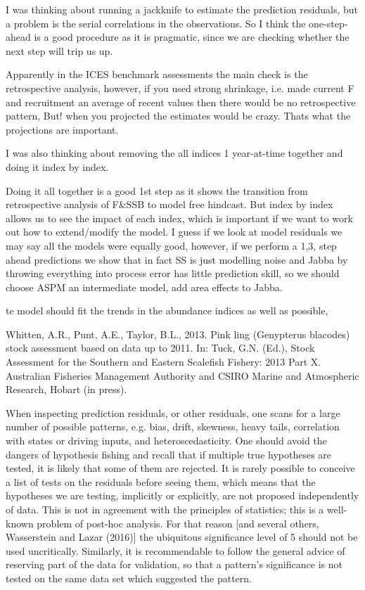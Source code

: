
I was thinking about running a jackknife to estimate the prediction residuals, but a problem is the serial correlations in the observations. So I think the one-step-ahead is a good procedure as it is pragmatic, since we are checking whether the next step will trip us up.

Apparently in the ICES benchmark assessments the main check is the retrospective analysis, however, if you used strong shrinkage, i.e. made current F and recruitment an average of recent values then there would be no retrospective pattern, But! when you projected the estimates would be crazy. Thats what the projections are important.

I was also thinking about removing the all indices 1 year-at-time together and doing it index by index.

Doing it all together is a good 1st step as it shows the transition from retrospective analysis of F&SSB to model free hindcast. But index by index allows us to see the impact of each index, which is important if we want to work out how to extend/modify the model.
I guess if we look at  model residuals we may say all the models were equally good, however, if we perform a 1,3, step ahead predictions we show that in fact SS is just modelling noise and Jabba by throwing everything into process error has little prediction skill, so we should choose ASPM an intermediate model, add area effects to Jabba.

te model should fit the trends in the abundance indices as well as possible,

Whitten, A.R., Punt, A.E., Taylor, B.L., 2013. Pink ling (Genypterus blacodes) stock
assessment based on data up to 2011. In: Tuck, G.N. (Ed.), Stock Assessment for
the Southern and Eastern Scalefish Fishery: 2013 Part X. Australian Fisheries
Management Authority and CSIRO Marine and Atmospheric Research, Hobart
(in press).


When inspecting prediction residuals, or other residuals, one scans for a large number of possible patterns, e.g. bias, drift, skewness, heavy tails, correlation with states
or driving inputs, and heteroscedasticity. One should avoid the dangers of hypothesis
fishing and recall that if multiple true hypotheses are tested, it is likely that some of
them are rejected. It is rarely possible to conceive a list of tests on the residuals before
seeing them, which means that the hypotheses we are testing, implicitly or explicitly,
are not proposed independently of data. This is not in agreement with the principles
of statistics; this is a well-known problem of post-hoc analysis. For that reason [and
several others, Wasserstein and Lazar (2016)] the ubiquitous significance level of 5%
should not be used uncritically. Similarly, it is recommendable to follow the general
advice of reserving part of the data for validation, so that a pattern’s significance is
not tested on the same data set which suggested the pattern.

